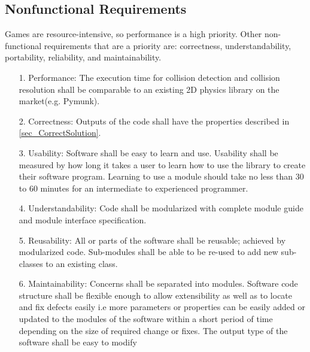 \documentclass[12pt]{article}
\begin{document}
\subsection{Nonfunctional Requirements}
Games are resource-intensive, so performance is a high priority.
Other non-functional requirements that are a priority are: correctness,
understandability, portability, reliability, and maintainability. 

\begin{itemize}

\item[1.] Performance: The execution time for collision detection and collision resolution shall be comparable to an existing 2D physics library on the market(e.g. Pymunk). 
\item[2.] Correctness: Outputs of the code shall have the 
properties described in \ref{sec_CorrectSolution}.

\item[3.] Usability: Software shall be easy to learn and use. Usability shall be measured by how long it takes a user to learn how to use the library to create their software program. Learning to use a module should take no less than 30 to 60 minutes for an intermediate to experienced programmer. 

\item[4.] Understandability: Code shall be modularized with complete module 
guide and module interface specification. 

\item[5.] Reusability: All or parts of the software shall be reusable; achieved by modularized code. Sub-modules shall be able to be re-used to add new sub-classes to an existing class. 

\item[6.] Maintainability: Concerns shall be separated into modules. Software code structure shall be flexible enough to allow extensibility as well as to locate and fix defects easily i.e more parameters or properties can be easily added or updated to the modules of the software within a short period of time depending on the size of required change or fixes. The output type of the software shall be easy to modify
  

\end{itemize}
\end{document}
